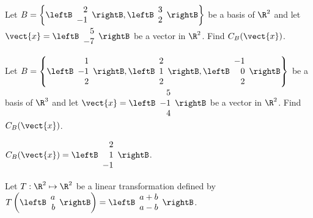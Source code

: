 \begin{enumialphparenastyle}
\begin{ex}
Let $B = \left\{ \leftB \begin{array}{r}
2 \\
-1 
\end{array} \rightB, \leftB \begin{array}{r}
3 \\
2
\end{array} \rightB \right\}$ be a basis of $\R^2$ and let $\vect{x} = \leftB
\begin{array}{r}
5 \\
-7
\end{array}
\rightB$ be a vector in $\R^2$. Find $C_B(\vect{x})$. 
\end{ex}

\begin{ex}
Let $B = \left\{ \leftB \begin{array}{r}
1 \\
-1 \\
2 
\end{array} \rightB, \leftB \begin{array}{r}
2 \\
1 \\
2
 \end{array} \rightB, \leftB \begin{array}{r}
-1 \\
0 \\
2
\end{array} \rightB \right\}$ 
be a basis of $\R^3$ and let $\vect{x} = \leftB
\begin{array}{r}
5 \\
-1 \\
4
\end{array}
\rightB$ be a vector in $\R^2$. Find $C_B(\vect{x})$. 
\begin{sol}
 $C_B(\vect{x}) = 
\leftB \begin{array}{r}
2 \\
1 \\
-1
 \end{array} \rightB $.
\end{sol}
\end{ex}


\begin{ex}
Let $T: \R^2 \mapsto \R^2$ be a linear transformation defined by $T \left( \leftB \begin{array}{r}
a \\
b
\end{array} \rightB \right) = \leftB \begin{array}{r}
a+b \\
a-b
\end{array} \rightB$. 


\end{ex}
\end{enumialphparenastyle}
